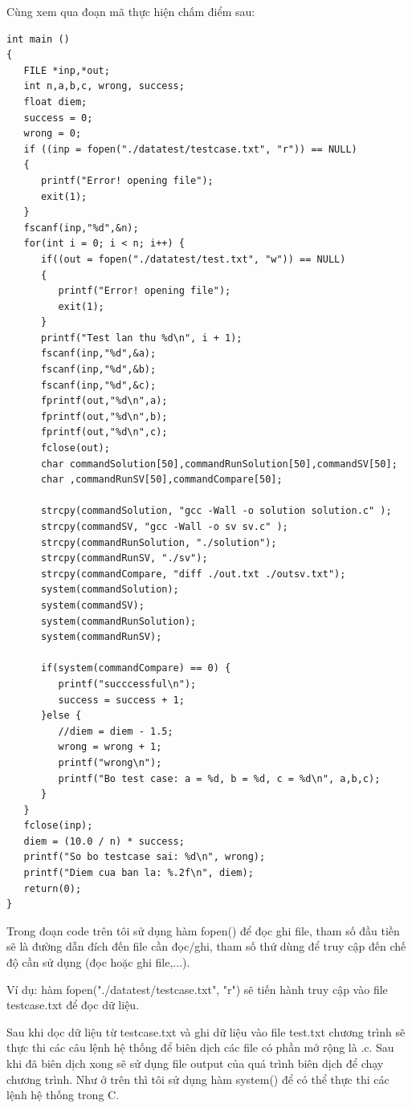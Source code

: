 \documentclass[12pt,a4paper]{article}
\begin{document}
Cùng xem qua đoạn mã thực hiện chấm điểm sau:

\begin{lstlisting}
int main ()
{
   FILE *inp,*out;
   int n,a,b,c, wrong, success;
   float diem;
   success = 0;
   wrong = 0;
   if ((inp = fopen("./datatest/testcase.txt", "r")) == NULL)
   {
      printf("Error! opening file");
      exit(1);         
   }
   fscanf(inp,"%d",&n);
   for(int i = 0; i < n; i++) {
      if((out = fopen("./datatest/test.txt", "w")) == NULL)
      {
         printf("Error! opening file");
         exit(1);         
      }
      printf("Test lan thu %d\n", i + 1);
      fscanf(inp,"%d",&a);
      fscanf(inp,"%d",&b);
      fscanf(inp,"%d",&c);
      fprintf(out,"%d\n",a);
      fprintf(out,"%d\n",b);
      fprintf(out,"%d\n",c);
      fclose(out);
      char commandSolution[50],commandRunSolution[50],commandSV[50];
      char ,commandRunSV[50],commandCompare[50];

      strcpy(commandSolution, "gcc -Wall -o solution solution.c" );
      strcpy(commandSV, "gcc -Wall -o sv sv.c" );
      strcpy(commandRunSolution, "./solution");
      strcpy(commandRunSV, "./sv");
      strcpy(commandCompare, "diff ./out.txt ./outsv.txt");
      system(commandSolution);
      system(commandSV);
      system(commandRunSolution);
      system(commandRunSV);

      if(system(commandCompare) == 0) {
         printf("succcessful\n");
         success = success + 1;
      }else {
         //diem = diem - 1.5;
         wrong = wrong + 1;
         printf("wrong\n");
         printf("Bo test case: a = %d, b = %d, c = %d\n", a,b,c);
      }
   }
   fclose(inp);
   diem = (10.0 / n) * success;
   printf("So bo testcase sai: %d\n", wrong);
   printf("Diem cua ban la: %.2f\n", diem);
   return(0);
}
\end{lstlisting}

Trong đoạn code trên tôi sử dụng hàm fopen() để đọc ghi file, tham số đầu tiền sẽ là đường dẫn đích đến file cần đọc/ghi, tham số thứ dùng để truy cập đến chế độ cần sử dụng (đọc hoặc ghi file,...).

Ví dụ: hàm fopen("./datatest/testcase.txt", "r") sẽ tiến hành truy cập vào file testcase.txt để đọc dữ liệu.

Sau khi dọc dữ liệu từ testcase.txt và ghi dữ liệu vào file test.txt chương trình sẽ thực thi các câu lệnh hệ thống để biên dịch các file có phần mở rộng là .c. Sau khi đã biên dịch xong sẽ sử dụng file output của quá trình biên dịch để chạy chương trình. Như ở trên thì tôi sử dụng hàm system() để có thể thực thi các lệnh hệ thống trong C.
\end{document}
